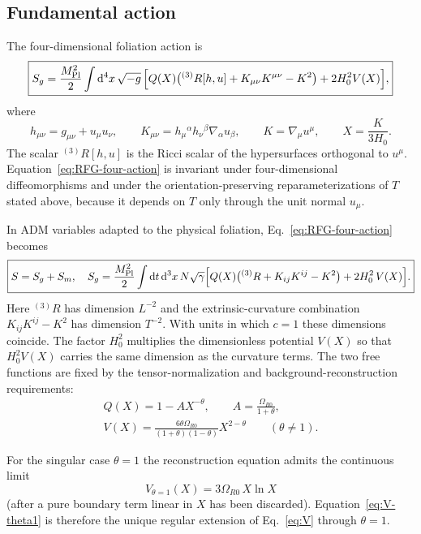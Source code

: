 \documentclass[11pt,a4paper]{article}
\renewcommand{\dd}{\mathrm{d}}
\newcommand{\mpl}{M_{\rm Pl}}
\newcommand{\threeR}{{}^{(3)}R}
\newcommand{\Boxed}[1]{\boxed{\displaystyle #1}}
\begin{document}
\subsection{Fundamental action}

The four-dimensional foliation action is
\begin{equation}
\Boxed{
S_g=\frac{\mpl^2}{2}
\int \dd^4x\,\sqrt{-g}\,
\Bigl[
Q(X)\bigl({}^{(3)}R[h,u]+K_{\mu\nu}K^{\mu\nu}-K^2\bigr)
+2H_0^2V(X)
\Bigr],
}
\label{eq:RFG-four-action}
\end{equation}
where
\[
h_{\mu\nu}=g_{\mu\nu}+u_\mu u_\nu,\qquad
K_{\mu\nu}=h_\mu{}^\alpha h_\nu{}^\beta\nabla_\alpha u_\beta,\qquad
K=\nabla_\mu u^\mu,\qquad
X=\frac{K}{3H_0}.
\]
The scalar \({}^{(3)}R[h,u]\) is the Ricci scalar of the hypersurfaces orthogonal to \(u^\mu\). Equation~\eqref{eq:RFG-four-action} is invariant under four-dimensional diffeomorphisms and under the orientation-preserving reparameterizations of \(T\) stated above, because it depends on \(T\) only through the unit normal \(u_\mu\).

In ADM variables adapted to the physical foliation, Eq.~\eqref{eq:RFG-four-action} becomes
\begin{equation}
\Boxed{
S=S_g+S_m,
\quad
S_g=\frac{\mpl^2}{2}\int\dd t\,\dd^3x\,N\sqrt{\gamma}
\Bigl[Q(X)\bigl({}^{(3)}R+K_{ij}K^{ij}-K^2\bigr)+2H_0^2\,V(X)\Bigr].
}
\label{eq:RFG-action}
\end{equation}
Here \(\threeR\) has dimension \(L^{-2}\) and the extrinsic-curvature combination \(K_{ij}K^{ij}-K^2\) has dimension \(T^{-2}\). With units in which \(c=1\) these dimensions coincide. The factor \(H_0^2\) multiplies the dimensionless potential \(V(X)\) so that \(H_0^2 V(X)\) carries the same dimension as the curvature terms. The two free functions are fixed by the tensor-normalization and background-reconstruction requirements:
\begin{align}
\Boxed{Q(X)=1-A X^{-\theta},\qquad A=\frac{\Omega_{R0}}{1+\theta},}
\label{eq:Q}\\[0.5em]
\Boxed{V(X)=\frac{6\theta\Omega_{R0}}{(1+\theta)(1-\theta)}X^{2-\theta}\qquad(\theta\neq1).}
\label{eq:V}
\end{align}

For the singular case \(\theta=1\) the reconstruction equation admits the continuous limit
\begin{equation}
\Boxed{V_{\theta=1}(X)=3\Omega_{R0}\,X\ln X}
\label{eq:V-theta1}
\end{equation}
(after a pure boundary term linear in \(X\) has been discarded). Equation~\eqref{eq:V-theta1} is therefore the unique regular extension of Eq.~\eqref{eq:V} through \(\theta=1\).
\end{document}
